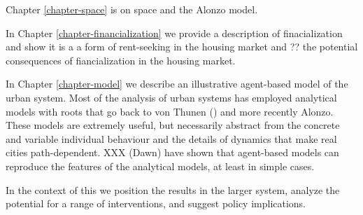 

Chapter \ref{chapter-space} is on space and the Alonzo model.

In Chapter \ref{chapter-financialization} we  provide a description of finacialization and show it is a a form of rent-seeking in the housing market and ?? the potential consequences of fiancialization in the housing market. 

In Chapter \ref{chapter-model} we  describe an illustrative agent-based model of the urban system. Most of the analysis of urban systems has employed analytical models with roots that go back to von Thunen () and more recently Alonzo. These models are extremely useful, but necessarily abstract from the concrete  and variable individual behaviour and  the details  of dynamics that make real cities path-dependent. XXX (Dawn) have shown that agent-based models can reproduce the features of the analytical models, at least in simple cases. 


In the context of this we position the results in the larger system, analyze the potential for a range of interventions, and suggest policy implications.



